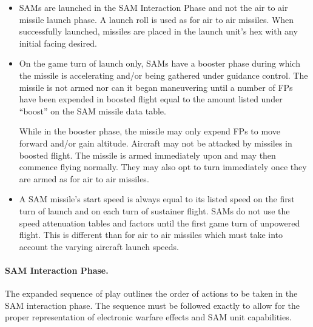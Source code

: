 \begin{itemize}

    \item{} SAMs are launched in the SAM Interaction Phase and not the air to air missile launch phase. A launch roll is used as for air to air missiles. When successfully launched, missiles are placed in the launch unit's hex with any initial facing desired.

    \item{} On the game turn of launch only, SAMs have a booster phase during which the missile is accelerating and/or being gathered under guidance control. The missile is not armed nor can it began maneuvering until a number of FPs have been expended in boosted flight equal to the amount listed under “boost” on the SAM missile data table.

    While in the booster phase, the missile may only expend FPs to move forward and/or gain altitude. Aircraft may not be attacked by missiles in boosted flight. The missile is armed immediately upon  and may then commence flying normally. They may also opt to turn immediately once they are armed as for air to air missiles.

    \item{} A SAM missile's start speed is always equal to its listed speed on the first turn of launch and on each turn of sustainer flight. SAMs do not use the speed attenuation tables and factors until the first game turn of unpowered flight. This is different than for air to air missiles which must take into account the varying aircraft launch speeds. 

\end{itemize}

\paragraph{SAM Interaction Phase.} The expanded sequence of play outlines the order of actions to be taken in the SAM interaction phase. The sequence must be followed exactly to allow for the proper representation of electronic warfare effects and SAM unit capabilities.

